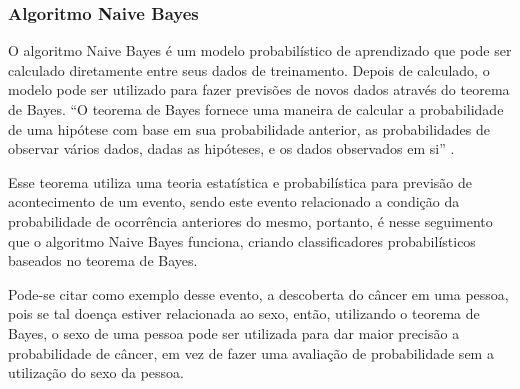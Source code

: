 % 
% 
%  
%  


\subsubsection{Algoritmo Naive Bayes}\label{cap:refTeor:sssec:nbayes}

O algoritmo Naive Bayes é um modelo probabilístico de aprendizado que pode ser calculado diretamente entre seus dados de treinamento. Depois de calculado, o modelo pode ser utilizado para fazer previsões de novos dados através do teorema de Bayes. ``O teorema de Bayes fornece uma maneira de calcular a probabilidade de uma hipótese com base em sua probabilidade anterior, as probabilidades de observar vários dados, dadas as hipóteses, e os dados observados em si'' \cite[p. 156]{Mitchell1997}.



Esse teorema utiliza uma teoria estatística e probabilística para previsão de acontecimento de um evento, sendo este evento  relacionado a condição da probabilidade de ocorrência anteriores do mesmo, portanto, é nesse seguimento que o algoritmo Naive Bayes funciona, criando classificadores  probabilísticos baseados no teorema de Bayes.


Pode-se citar como exemplo desse evento, a descoberta do câncer em uma pessoa, pois se tal doença estiver relacionada ao sexo, então, utilizando o teorema de Bayes, o sexo de uma pessoa pode ser utilizada para dar maior precisão a probabilidade de câncer, em vez de fazer uma avaliação de probabilidade sem a utilização do sexo da pessoa.

